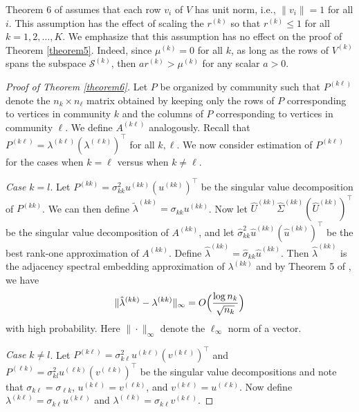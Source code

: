 \documentclass[12pt]{article}
\begin{document}
\begin{remark}
Theorem 6 of \citet{jmlr-v28-wang13} assumes that each row $v_i$
of $V$ has unit norm, i.e., $\|v_{i}\| = 1$  for all $i$. This
assumption has the effect of scaling the $r^{(k)}$ so that $r^{(k)}
\leq 1$ for all $k = 1,2,\dots,K$. We emphasize that this assumption
has no effect on the proof of Theorem \ref{theorem5}. Indeed,
since $\mu^{(k)} = 0$ for all $k$, as long as the rows of $V^{(k)}$
spans the subspace $\mathcal{S}^{(k)}$, then $a r^{(k)} > \mu^{(k)}$ 
for any scalar $a > 0$. 
\end{remark}

\begin{proof}[Proof of Theorem \ref{theorem6}] Let \(P\) be
organized by community such that \(P^{(k \ell)}\) denote the $n_k \times
n_{\ell}$ matrix obtained by keeping only the rows of $P$
corresponding to vertices in community $k$ and the columns of $P$
corresponding to vertices in community $\ell$. We define $A^{(k
  \ell)}$ analogously. Recall that $P^{(k \ell)} = \lambda^{(k \ell)} (\lambda^{(\ell k)})^{\top}$ for all $k, \ell$. We now consider estimation of $P^{(k \ell)}$
for the cases when $k = \ell$ versus when $k \not = \ell$.

\emph{Case \(k = l\)}. Let $P^{(kk)} =
\sigma_{kk}^2 u^{(kk)} (u^{(kk)})^\top$ be the singular value
decomposition of $P^{(kk)}$. We can then define
$\tilde{\lambda}^{(kk)} = \sigma_{kk} u^{(kk)}$. 
Now let $\hat{U}^{(kk)} \hat{\Sigma}^{(kk)} (\hat{U}^{(kk)})^\top$ be the
singular value decomposition of \(A^{(kk)}\), and let
$\hat{\sigma}_{kk}^2 \hat{u}^{(kk)} (\hat{u}^{(kk)})^\top$ be the
best rank-one approximation of $A^{(kk)}$. Define
\(\hat{\lambda}^{(kk)} = \hat{\sigma}_{kk} \hat{u}^{(kk)}\). Then
\(\hat{\lambda}^{(kk)}\) is the adjacency spectral embedding approximation of \(\lambda^{(kk)}\)
and by Theorem 5 of \citet{rubindelanchy2017statistical}, we have
$$\|\hat{\lambda}^{(kk)} - \lambda^{(kk)}\|_{\infty} = O\Bigl(\frac{\log n_k}{\sqrt{n_k}}\Bigr)$$
with high probability. 
Here $\|\cdot\|_{\infty}$ denote the $\ell_{\infty}$ norm of a vector.

\emph{Case \(k \neq l\)}. %
Let \(P^{(k \ell)} = \sigma_{k \ell}^2 u^{(k \ell)} (v^{(k \ell)})^\top\) and 
\(P^{(\ell k)} = \sigma_{kl}^2 u^{(\ell k)} (v^{(\ell k)})^\top\)  be the singular
value decompositions and note that \(\sigma_{k \ell} = \sigma_{\ell
  k}\), \(u^{(k \ell)} = v^{(\ell k)}\), and
\(v^{(k \ell)} = u^{(\ell k)}\). 
Now define \(\lambda^{(k \ell)} = \sigma_{k \ell} u^{(k \ell)}\) and
\(\lambda^{(\ell k)} = \sigma_{k \ell}
v^{(k \ell)}\).


\end{proof}
\end{document}
